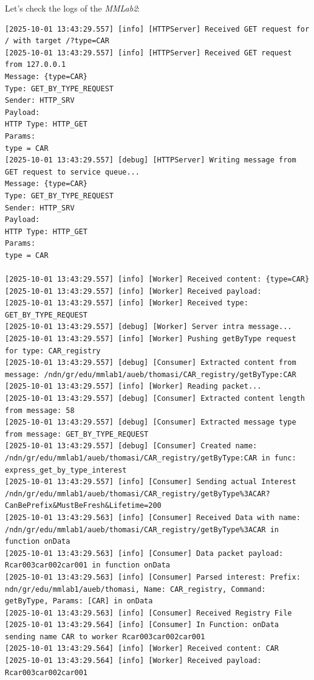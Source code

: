 \documentclass{article}
\begin{document}
Let's check the logs of the \emph{MMLab2}: 
\begin{lstlisting}[language=log, caption={\emph{MMLab2} after receive a response for its \emph{GET by TYPE} request for \textit{@type=CAR}}, label={lst:response-from-get-by-type}]
[2025-10-01 13:43:29.557] [info] [HTTPServer] Received GET request for / with target /?type=CAR
[2025-10-01 13:43:29.557] [info] [HTTPServer] Received GET request from 127.0.0.1
Message: {type=CAR}
Type: GET_BY_TYPE_REQUEST
Sender: HTTP_SRV
Payload: 
HTTP Type: HTTP_GET
Params:
type = CAR
[2025-10-01 13:43:29.557] [debug] [HTTPServer] Writing message from GET request to service queue...
Message: {type=CAR}
Type: GET_BY_TYPE_REQUEST
Sender: HTTP_SRV
Payload: 
HTTP Type: HTTP_GET
Params:
type = CAR

[2025-10-01 13:43:29.557] [info] [Worker] Received content: {type=CAR}
[2025-10-01 13:43:29.557] [info] [Worker] Received payload: 
[2025-10-01 13:43:29.557] [info] [Worker] Received type: GET_BY_TYPE_REQUEST
[2025-10-01 13:43:29.557] [debug] [Worker] Server intra message...
[2025-10-01 13:43:29.557] [info] [Worker] Pushing getByType request for type: CAR_registry
[2025-10-01 13:43:29.557] [debug] [Consumer] Extracted content from message: /ndn/gr/edu/mmlab1/aueb/thomasi/CAR_registry/getByType:CAR
[2025-10-01 13:43:29.557] [info] [Worker] Reading packet...
[2025-10-01 13:43:29.557] [debug] [Consumer] Extracted content length from message: 58
[2025-10-01 13:43:29.557] [debug] [Consumer] Extracted message type from message: GET_BY_TYPE_REQUEST
[2025-10-01 13:43:29.557] [debug] [Consumer] Created name: /ndn/gr/edu/mmlab1/aueb/thomasi/CAR_registry/getByType:CAR in func: express_get_by_type_interest
[2025-10-01 13:43:29.557] [info] [Consumer] Sending actual Interest /ndn/gr/edu/mmlab1/aueb/thomasi/CAR_registry/getByType%3ACAR?CanBePrefix&MustBeFresh&Lifetime=200
[2025-10-01 13:43:29.563] [info] [Consumer] Received Data with name: /ndn/gr/edu/mmlab1/aueb/thomasi/CAR_registry/getByType%3ACAR in function onData
[2025-10-01 13:43:29.563] [info] [Consumer] Data packet payload: Rcar003car002car001 in function onData
[2025-10-01 13:43:29.563] [info] [Consumer] Parsed interest: Prefix: ndn/gr/edu/mmlab1/aueb/thomasi, Name: CAR_registry, Command: getByType, Params: [CAR] in onData
[2025-10-01 13:43:29.563] [info] [Consumer] Received Registry File
[2025-10-01 13:43:29.564] [info] [Consumer] In Function: onData sending name CAR to worker Rcar003car002car001
[2025-10-01 13:43:29.564] [info] [Worker] Received content: CAR
[2025-10-01 13:43:29.564] [info] [Worker] Received payload: Rcar003car002car001

\end{lstlisting}
\end{document}
